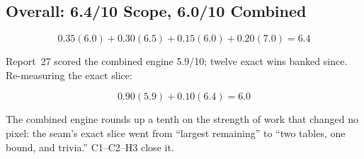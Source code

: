 \documentclass[11pt,a4paper]{article}
\begin{document}
\subsection{Overall: 6.4/10 Scope, 6.0/10 Combined}

\begin{equation}
0.35(6.0) + 0.30(6.5) + 0.15(6.0) + 0.20(7.0) = \mathbf{6.4}
\end{equation}

Report~27 scored the combined engine 5.9/10; twelve exact wins banked
since. Re-measuring the exact slice:

\begin{equation}
0.90(5.9) + 0.10(6.4) = \mathbf{6.0}
\end{equation}

The combined engine rounds up a tenth on the strength of work that changed
no pixel: the seam's exact slice went from ``largest remaining'' to
``two tables, one bound, and trivia.'' C1--C2--H3 close it.
\end{document}
